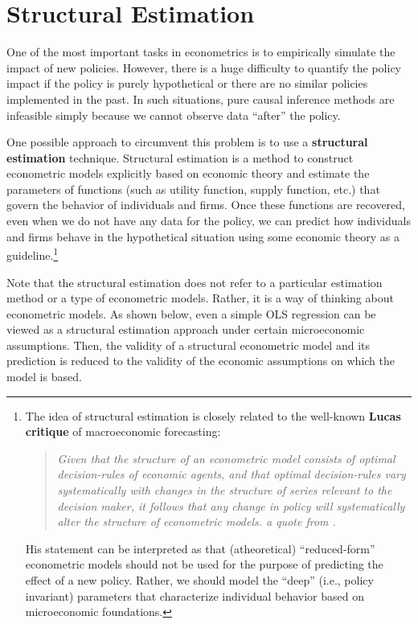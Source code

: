 \documentclass[10.5pt, A4paper, openany, uplatex]{book}
\numberwithin{equation}{section}
\begin{document}

\chapter{Structural Estimation}

One of the most important tasks in econometrics is to empirically simulate the impact of new policies.
However, there is a huge difficulty to quantify the policy impact if the policy is purely hypothetical or there are no similar policies implemented in the past.
In such situations, pure causal inference methods are infeasible simply because we cannot observe data ``after'' the policy.

One possible approach to circumvent this problem is to use a \textbf{structural estimation} technique.
Structural estimation is a method to construct econometric models explicitly based on economic theory and  estimate the parameters of functions (such as utility function, supply function, etc.) that govern the behavior of individuals and firms.
Once these functions are recovered, even when we do not have any data for the policy, we can predict how individuals and firms behave in the hypothetical situation using some economic theory as a guideline.\footnote{
	The idea of structural estimation is closely related to the well-known \textbf{Lucas critique} of macroeconomic forecasting:
	\begin{quote}\it
		Given that the structure of an econometric model consists of optimal decision-rules of economic agents, and that optimal decision-rules vary systematically with changes in the structure of series relevant to the decision maker, it follows that any change in policy will systematically alter the structure of econometric models. \upshape a quote from \cite{LUCAS197619}.
	\end{quote}
	His statement can be interpreted as that (atheoretical) ``reduced-form'' econometric models should not be used for the purpose of predicting the effect of a new policy.
	Rather, we should model the ``deep'' (i.e., policy invariant) parameters that characterize individual behavior based on microeconomic foundations.
	}

Note that the structural estimation does not refer to a particular estimation method or a type of econometric models.
Rather, it is a way of thinking about econometric models.
As shown below, even a simple OLS regression can be viewed as a structural estimation approach under certain microeconomic assumptions.
Then, the validity of a structural econometric model and its prediction is reduced to the validity of the economic assumptions on which the model is based.
\end{document}
